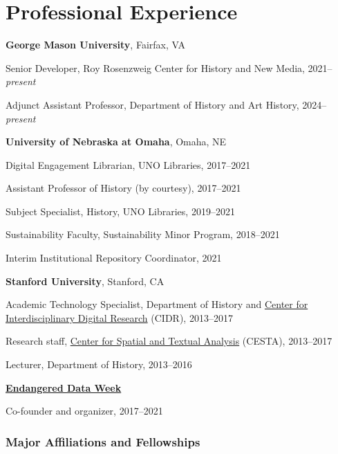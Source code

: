 \section{Professional Experience}\label{professional-experience}

\textbf{George Mason University}, Fairfax, VA

\quad Senior Developer, Roy Rosenzweig Center for History and New Media,
2021--\emph{present}

\quad Adjunct Assistant Professor, Department of History and Art
History, 2024--\emph{present}

\vspace{.4cm}

\textbf{University of Nebraska at Omaha}, Omaha, NE

\quad Digital Engagement Librarian, UNO Libraries, 2017--2021

\quad Assistant Professor of History (by courtesy), 2017--2021

\quad Subject Specialist, History, UNO Libraries, 2019--2021

\quad Sustainability Faculty, Sustainability Minor Program, 2018--2021

\quad Interim Institutional Repository Coordinator, 2021

\vspace{.4cm}

\textbf{Stanford University}, Stanford, CA

\quad Academic Technology Specialist, Department of History and
\href{http://cidr.stanford.edu}{Center for Interdisciplinary Digital
Research} (CIDR), 2013--2017

\quad Research staff, \href{http://cesta.stanford.edu}{Center for
Spatial and Textual Analysis} (CESTA), 2013--2017

\quad Lecturer, Department of History, 2013--2016

\vspace{.4cm}

\textbf{\href{https://endangereddataweek.org}{Endangered Data Week}}

\quad Co-founder and organizer, 2017--2021

\vspace{0.2cm}

\subsubsection{Major Affiliations and
Fellowships}\label{major-affiliations-and-fellowships}

